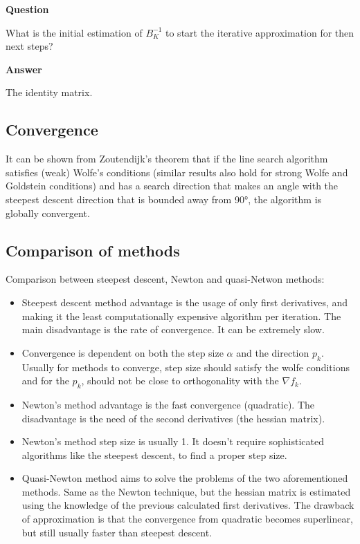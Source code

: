 \documentclass[a4paper,11pt]{article}
\numberwithin{equation}{section} %
\begin{document}
\textbf{Question}

What is the initial estimation of $B_K^{-1}$ to start the iterative approximation for then next steps?

\textbf{Answer}

The identity matrix.

\subsection{Convergence}

It can be shown from Zoutendijk's theorem that if the line search algorithm satisfies (weak) Wolfe's conditions (similar results also hold for strong Wolfe and Goldstein conditions) and has a search direction that makes an angle with the steepest descent direction that is bounded away from 90°, the algorithm is globally convergent.

\subsection{Comparison of methods}

Comparison between steepest descent, Newton and quasi-Netwon methods:

\begin{itemize}
    \item Steepest descent method advantage is the usage of only first derivatives, and making it the least computationally expensive algorithm per iteration. The main disadvantage is the rate of convergence. It can be extremely slow.

    \item Convergence is dependent on both the step size $\alpha$ and the direction $p_k$. Usually for methods to converge, step size should satisfy the wolfe conditions and for the $p_k$, should not be close to orthogonality with the $\nabla f_k$.

    \item Newton's method advantage is the fast convergence (quadratic). The disadvantage is the need of the second derivatives (the hessian matrix).

    \item Newton's method step size is usually 1. It doesn't require sophisticated algorithms like the steepest descent, to find a proper step size.

    \item Quasi-Newton method aims to solve the problems of the two aforementioned methods. Same as the Newton technique, but the hessian matrix is estimated using the knowledge of the previous calculated first derivatives. The drawback of approximation is that the convergence from quadratic becomes superlinear, but still usually faster than steepest descent.

\end{itemize}
\end{document}
